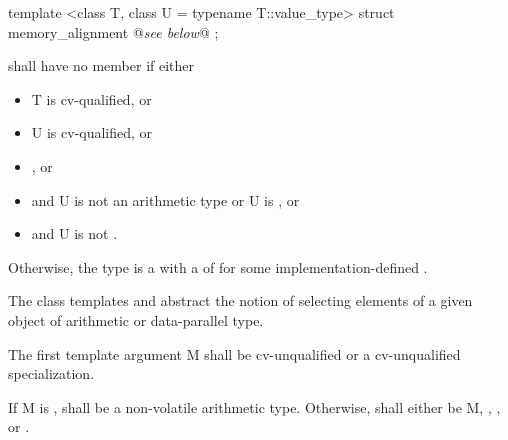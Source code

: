 \begin{itemdecl}
template <class T, class U = typename T::value_type> struct memory_alignment { @\emph{see below}@ };
\end{itemdecl}
\begin{itemdescr}
  \pnum
   shall have no member  if either
  \begin{itemize}
    \item \type T is cv-qualified, or
    \item \type U is cv-qualified, or
    \item {}, or
    \item {} and \type U is not an arithmetic type or \type U is \bool, or
    \item {} and \type U is not \bool.
  \end{itemize}

  \pnum
  Otherwise, the type  is a \BinaryTypeTrait with a \BaseCharacteristic of  for some implementation-defined .

  \pnum{}
\end{itemdescr}



\pnum The class templates  and  abstract the notion of selecting elements of a given object of arithmetic or data-parallel type.

\pnum The first template argument \type M shall be cv-unqualified \bool or a cv-unqualified \mask specialization.

\pnum
If \type M is \bool,  shall be a non-volatile arithmetic type.
Otherwise,  shall either be \type M, , , or .



